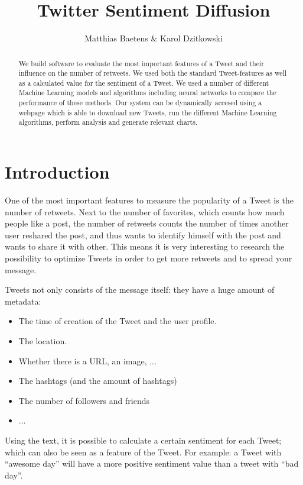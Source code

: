 \documentclass[10pt]{IEEEtran}
\title{Twitter Sentiment Diffusion}
\author{Matthias Baetens \& Karol Dzitkowski}
\begin{document}
\maketitle

\begin{abstract}
We build software to evaluate the most important features of a Tweet and their influence on the number of retweets. We used both the standard Tweet-features as well as a calculated value for the sentiment of a Tweet. We used a number of different Machine Learning models and algorithms including neural networks to compare the performance of these methods. Our system can be dynamically accesed using a webpage which is able to download new Tweets, run the different Machine Learning algorithms, perform analysis and generate relevant charts. 
\end{abstract}

\section{Introduction}
One of the most important features to measure the popularity of a Tweet is the number of retweets. Next to the number of favorites, which counts how much people like a post, the number of retweets counts the number of times another user reshared the post, and thus wants to identify himself with the post and wants to share it with other. This means it is very interesting to research the possibility to optimize Tweets in order to get more retweets and to spread your message. 

Tweets not only consists of the message itself: they have a huge amount of metadata: 
\begin{itemize}
\item The time of creation of the Tweet and the user profile.
\item The location. 
\item Whether there is a URL, an image, ...
\item The hashtags (and the amount of hashtags)
\item The number of followers and friends
\item ...
\end{itemize}

Using the text, it is possible to calculate a certain sentiment for each Tweet; which can also be seen as a feature of the Tweet. For example: a Tweet with ``awesome day'' will have a more positive sentiment value than a tweet with ``bad day''.
\end{document}
